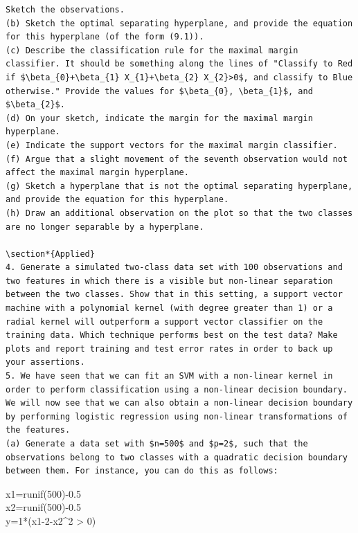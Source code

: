 \documentclass[10pt]{article}
\begin{document}
\begin{verbatim}
Sketch the observations.
(b) Sketch the optimal separating hyperplane, and provide the equation for this hyperplane (of the form (9.1)).
(c) Describe the classification rule for the maximal margin classifier. It should be something along the lines of "Classify to Red if $\beta_{0}+\beta_{1} X_{1}+\beta_{2} X_{2}>0$, and classify to Blue otherwise." Provide the values for $\beta_{0}, \beta_{1}$, and $\beta_{2}$.
(d) On your sketch, indicate the margin for the maximal margin hyperplane.
(e) Indicate the support vectors for the maximal margin classifier.
(f) Argue that a slight movement of the seventh observation would not affect the maximal margin hyperplane.
(g) Sketch a hyperplane that is not the optimal separating hyperplane, and provide the equation for this hyperplane.
(h) Draw an additional observation on the plot so that the two classes are no longer separable by a hyperplane.

\section*{Applied}
4. Generate a simulated two-class data set with 100 observations and two features in which there is a visible but non-linear separation between the two classes. Show that in this setting, a support vector machine with a polynomial kernel (with degree greater than 1) or a radial kernel will outperform a support vector classifier on the training data. Which technique performs best on the test data? Make plots and report training and test error rates in order to back up your assertions.
5. We have seen that we can fit an SVM with a non-linear kernel in order to perform classification using a non-linear decision boundary. We will now see that we can also obtain a non-linear decision boundary by performing logistic regression using non-linear transformations of the features.
(a) Generate a data set with $n=500$ and $p=2$, such that the observations belong to two classes with a quadratic decision boundary between them. For instance, you can do this as follows:
\end{verbatim}

\begin{displayquote}
x1=runif(500)-0.5\\
x2=runif(500)-0.5\\
y=1*(x1-2-x2\^{}2 > 0)
\end{displayquote}
\end{document}
